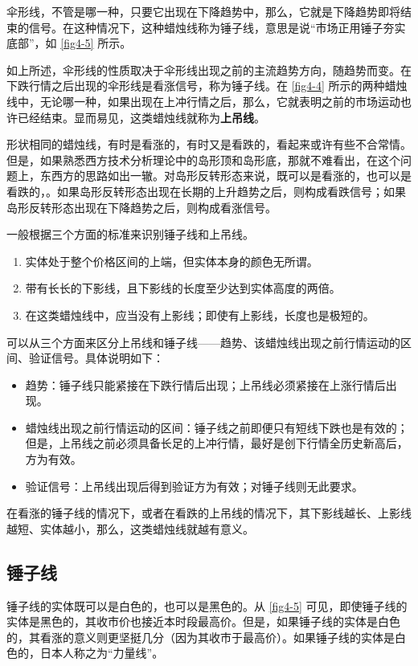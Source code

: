 
伞形线，不管是哪一种，只要它出现在下降趋势中，那么，它就是下降趋势即将结束的信号。在这种情况下，这种蜡烛线称为锤子线，意思是说“市场正用锤子夯实底部”，如 \autoref{fig4-5} 所示。


如上所述，伞形线的性质取决于伞形线出现之前的主流趋势方向，随趋势而变。在下跌行情之后出现的伞形线是看涨信号，称为锤子线。在 \autoref{fig4-4} 所示的两种蜡烛线中，无论哪一种，如果出现在上冲行情之后，那么，它就表明之前的市场运动也许已经结束。显而易见，这类蜡烛线就称为\textbf{上吊线}。

形状相同的蜡烛线，有时是看涨的，有时又是看跌的，看起来或许有些不合常情。但是，如果熟悉西方技术分析理论中的岛形顶和岛形底，那就不难看出，在这个问题上，东西方的思路如出一辙。对岛形反转形态来说，既可以是看涨的，也可以是看跌的，。如果岛形反转形态出现在长期的上升趋势之后，则构成看跌信号；如果岛形反转形态出现在下降趋势之后，则构成看涨信号。

一般根据三个方面的标准来识别锤子线和上吊线。
\begin{enumerate}
    \item 实体处于整个价格区间的上端，但实体本身的颜色无所谓。
    \item 带有长长的下影线，且下影线的长度至少达到实体高度的两倍。
    \item 在这类蜡烛线中，应当没有上影线；即使有上影线，长度也是极短的。
\end{enumerate}

可以从三个方面来区分上吊线和锤子线——趋势、该蜡烛线出现之前行情运动的区间、验证信号。具体说明如下：
\begin{itemize}
    \item 趋势：锤子线只能紧接在下跌行情后出现；上吊线必须紧接在上涨行情后出现。
    \item 蜡烛线出现之前行情运动的区间：锤子线之前即便只有短线下跌也是有效的；但是，上吊线之前必须具备长足的上冲行情，最好是创下行情全历史新高后，方为有效。
    \item 验证信号：上吊线出现后得到验证方为有效；对锤子线则无此要求。
\end{itemize}

在看涨的锤子线的情况下，或者在看跌的上吊线的情况下，其下影线越长、上影线越短、实体越小，那么，这类蜡烛线就越有意义。
\subsection{锤子线}
锤子线的实体既可以是白色的，也可以是黑色的。从 \autoref{fig4-5} 可见，即使锤子线的实体是黑色的，其收市价也接近本时段最高价。但是，如果锤子线的实体是白色的，其看涨的意义则更坚挺几分（因为其收市于最高价）。如果锤子线的实体是白色的，日本人称之为“力量线”。
